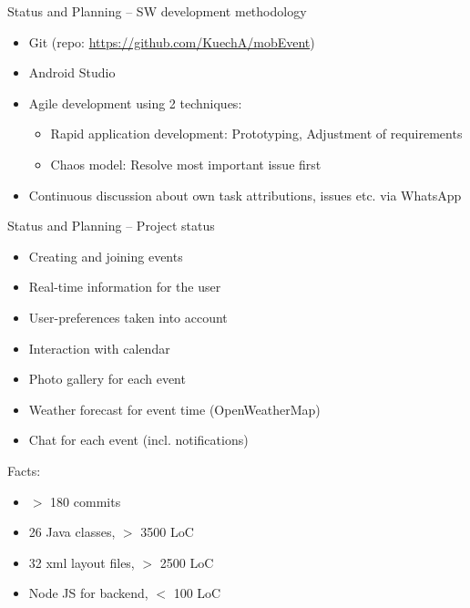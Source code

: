\documentclass[logo=EURECOM,english]{eurecombeamer}
\begin{document}
\begin{frame}{Status and Planning -- SW development methodology}
\begin{itemize}
\item Git (repo: \url{https://github.com/KuechA/mobEvent})
\item Android Studio
\item Agile development using 2 techniques:
	\begin{itemize}
	\item Rapid application development: Prototyping, Adjustment of requirements
	\item Chaos model: Resolve most important issue first
	\end{itemize}
\item Continuous discussion about own task attributions, issues etc. via WhatsApp
\end{itemize}
\end{frame}

\begin{frame}{Status and Planning -- Project status}
\begin{itemize}
\item Creating and joining events
\item Real-time information for the user
\item User-preferences taken into account
\item Interaction with calendar
\item Photo gallery for each event
\item Weather forecast for event time (OpenWeatherMap)
\item Chat for each event (incl. notifications)
\end{itemize}
Facts:
\begin{itemize}
\item $>$ 180 commits
\item 26 Java classes, $>$ 3500 LoC
\item 32 xml layout files, $>$ 2500 LoC 
\item Node JS for backend, $<$ 100 LoC
\end{itemize}
\end{frame}
\end{document}

